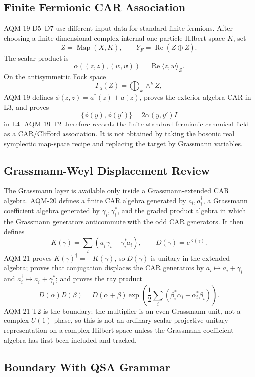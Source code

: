\subsection{Finite Fermionic CAR Association}

AQM-19 D5--D7 use different input data for standard finite fermions.  After
choosing a finite-dimensional complex internal one-particle Hilbert space
\(K\), set
\[
  Z=\operatorname{Map}(X,K),
  \qquad
  Y_F=\operatorname{Re}(Z\oplus\overline Z).
\]
The scalar product is
\[
  \alpha((z,\bar z),(w,\bar w))=\operatorname{Re}\langle z,w\rangle_Z.
\]
On the antisymmetric Fock space
\[
  \Gamma_{\mathrm a}(Z)=\bigoplus_k \wedge^k Z,
\]
AQM-19 defines \(\phi(z,\bar z)=a^*(z)+a(z)\), proves the exterior-algebra
CAR in L3, and proves
\[
  \{\phi(y),\phi(y')\}=2\alpha(y,y')I
\]
in L4.  AQM-19 T2 therefore records the finite standard fermionic canonical
field as a CAR/Clifford association.  It is not obtained by taking the
bosonic real symplectic map-space recipe and replacing the target by
Grassmann variables.

\subsection{Grassmann-Weyl Displacement Review}

The Grassmann layer is available only inside a Grassmann-extended CAR algebra.
AQM-20 defines a finite CAR algebra generated by \(a_i,a_i^\dagger\), a
Grassmann coefficient algebra generated by \(\gamma_i,\gamma_i^*\), and the
graded product algebra in which the Grassmann generators anticommute with the
odd CAR generators.  It then defines
\[
  K(\gamma)=\sum_i(a_i^\dagger\gamma_i-\gamma_i^*a_i),
  \qquad
  D(\gamma)=e^{K(\gamma)}.
\]
AQM-21 proves \(K(\gamma)^\dagger=-K(\gamma)\), so \(D(\gamma)\) is unitary
in the extended algebra; proves that conjugation displaces the CAR generators
by \(a_i\mapsto a_i+\gamma_i\) and
\(a_i^\dagger\mapsto a_i^\dagger+\gamma_i^*\); and proves the ray product
\[
  D(\alpha)D(\beta)
  =
  D(\alpha+\beta)
  \exp\!\left(
    \frac12\sum_i(\beta_i^*\alpha_i-\alpha_i^*\beta_i)
  \right).
\]
AQM-21 T2 is the boundary: the multiplier is an even Grassmann unit, not a
complex \(U(1)\) phase, so this is not an ordinary scalar-projective unitary
representation on a complex Hilbert space unless the Grassmann coefficient
algebra has first been included and tracked.

\subsection{Boundary With QSA Grammar}

